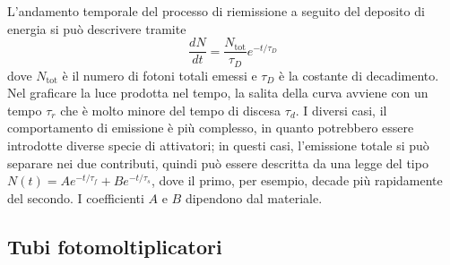 \documentclass[11pt, a4paper]{scrartcl}
\theoremstyle{style}
\numberwithin{equation}{subsection}
\begin{document}
L'andamento temporale del processo di riemissione a seguito del deposito di energia si pu\`o descrivere tramite
\[
\frac{d N}{d t}  = \frac{N_\text{tot}}{\tau _D} e^{- t / \tau _D}
\] 
dove $N_\text{tot}$ \`e il numero di fotoni totali emessi e $\tau _D$ \`e la costante di decadimento.
Nel graficare la luce prodotta nel tempo, la salita della curva avviene con un tempo $\tau _r$ che \`e molto minore del tempo di discesa $\tau _d$.
I diversi casi, il comportamento di emissione \`e pi\`u complesso, in quanto potrebbero essere introdotte diverse specie di attivatori; in questi casi, l'emissione totale si pu\`o separare nei due contributi, quindi pu\`o essere descritta da una legge del tipo $N(t) = A e^{- t / \tau _f} + B e^{-t / \tau _s}$, dove il primo, per esempio, decade pi\`u rapidamente del secondo.
I coefficienti $A$ e $B$ dipendono dal materiale.

\subsection{Tubi fotomoltiplicatori}
\end{document}
